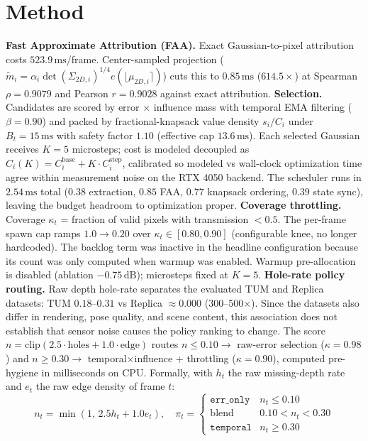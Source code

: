 \documentclass[10pt,twocolumn,letterpaper]{article}
\begin{document}
\section{Method}
\textbf{Fast Approximate Attribution (FAA).}
Exact Gaussian-to-pixel attribution costs $523.9\,\mathrm{ms}$/frame.
Center-sampled projection ($\tilde{m}_i = \alpha_i \det(\Sigma_{2D,i})^{1/4} e(\lfloor \mu_{2D,i} \rceil)$) cuts this to $\mathbf{0.85\,\mathrm{ms}}$ ($614.5\times$) at Spearman $\rho = 0.9079$ and Pearson $r = 0.9028$ against exact attribution.
\textbf{Selection.}
Candidates are scored by error $\times$ influence mass with temporal EMA filtering ($\beta = 0.90$) and packed by fractional-knapsack value density $s_i / C_i$ under $B_t = 15\,\mathrm{ms}$ with safety factor $1.10$ (effective cap $13.6\,\mathrm{ms}$).
Each selected Gaussian receives $K = 5$ microsteps; cost is modeled decoupled as $C_i(K) = C_i^{\mathrm{base}} + K \cdot C_i^{\mathrm{step}}$, calibrated so modeled vs wall-clock optimization time agree within measurement noise on the RTX 4050 backend.
The scheduler runs in $2.54\,\mathrm{ms}$ total ($0.38$ extraction, $0.85$ FAA, $0.77$ knapsack ordering, $0.39$ state sync), leaving the budget headroom to optimization proper.
\textbf{Coverage throttling.}
Coverage $\kappa_t$ = fraction of valid pixels with transmission $< 0.5$.
The per-frame spawn cap ramps $1.0 \to 0.20$ over $\kappa_t \in [0.80, 0.90]$ (configurable knee, no longer hardcoded). The backlog term was inactive in the headline configuration because its count was only computed when warmup was enabled.
Warmup pre-allocation is disabled (ablation $-0.75\,\mathrm{dB}$); microsteps fixed at $K = 5$.
\textbf{Hole-rate policy routing.}
Raw depth hole-rate separates the evaluated TUM and Replica datasets: TUM $0.18$--$0.31$ vs Replica $\approx 0.000$ (300--500$\times$). Since the datasets also differ in rendering, pose quality, and scene content, this association does not establish that sensor noise causes the policy ranking to change.
The score $n = \mathrm{clip}(2.5 \cdot \mathrm{holes} + 1.0 \cdot \mathrm{edge})$ routes $n \le 0.10 \to$ raw-error selection ($\kappa = 0.98$) and $n \ge 0.30 \to$ temporal$\times$influence + throttling ($\kappa = 0.90$), computed pre-hygiene in milliseconds on CPU.
Formally, with $h_t$ the raw missing-depth rate and $e_t$ the raw edge density of frame $t$:
{\footnotesize
\begin{equation}
n_t = \min(1,\, 2.5 h_t + 1.0 e_t), \quad
\pi_t = \begin{cases}
\texttt{err\_only} & n_t \le 0.10 \\
\text{blend} & 0.10 < n_t < 0.30 \\
\texttt{temporal} & n_t \ge 0.30
\end{cases}
\end{equation}
}
\end{document}
